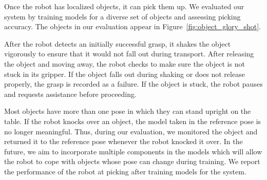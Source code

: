 \documentclass[graybox]{svmult}
\begin{document}
Once the robot has localized objects, it can pick them up.  We
evaluated our system by training models for a diverse set of objects
and assessing picking accuracy.  The objects in our evaluation appear
in Figure~\ref{fig:object_glory_shot}.

After the robot detects an initially successful grasp, it shakes the
object vigorously to ensure that it would not fall out during
transport. After releasing the object and moving away, the robot
checks to make sure the object is not stuck in its gripper. If the
object falls out during shaking or does not release properly, the
grasp is recorded as a failure. If the object is stuck, the robot
pauses and requests assistance before proceeding.

Most objects have more than one pose in which they can stand upright
on the table. If the robot knocks over an object, the model taken in
the reference pose is no longer meaningful. Thus, during our
evaluation, we monitored the object and returned it to the reference
pose whenever the robot knocked it over. In the future, we aim to
incorporate multiple components in the models which will allow the
robot to cope with objects whose pose can change during training.  We
report the performance of the robot at picking after training models
for the system.
\end{document}
